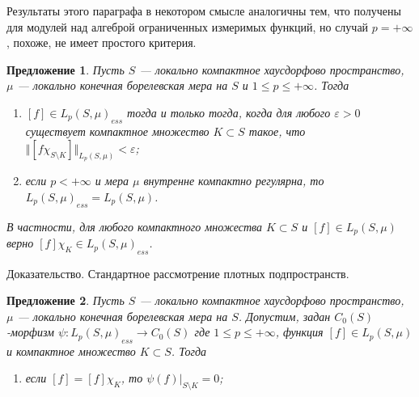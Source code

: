 \documentclass[12pt]{article}
\numberwithin{equation}{subsection}
\theoremstyle{plain}
\newtheorem{proposition}{Предложение}
\newenvironment{proof}{Доказательство.}{}
\begin{document}
\begin{fulltext}
    Результаты этого параграфа в некотором смысле аналогичны тем, что получены
    для модулей над алгеброй ограниченных измеримых функций, но случай
    $p=+\infty$, похоже, не имеет простого критерия.

    \begin{proposition}\label{LpEssC0ModCharac} Пусть $S$ --- локально
        компактное хаусдорфово пространст\-во, $\mu$ --- локально конечная
        борелевская мера на $S$ и $1\leq p\leq+\infty$. Тогда

        \begin{enumerate}[label = (\roman*)]
            \item $[f]\in {L_p(S,\mu)}_{ess}$ тогда и только тогда, когда для
                  любого $\varepsilon >0$ существует компактное множество
                  $K\subset S$ такое, что $\Vert [f\chi_{S\setminus
                              K}]\Vert_{L_p(S,\mu)}< \varepsilon$;

            \item если $p<+\infty$ и мера $\mu$ внутренне компактно регулярна,
                  то ${L_p(S,\mu)}_{ess}=L_p(S,\mu)$.
        \end{enumerate}

        В частности, для любого компактного множества $K\subset S$ и $[f]\in
            L_p(S,\mu)$ верно $[f]\chi_K\in {L_p(S,\mu)}_{ess}$.
    \end{proposition}
    \begin{proof} Стандартное рассмотрение плотных подпространств.
    \end{proof}

    \begin{proposition}\label{MorphLpEssC0Prop} Пусть $S$ --- локально
        компактное хаусдорфово пространст\-во, $\mu$ --- локально конечная
        борелевская мера на $S$. Допустим, задан $C_0(S)$-морфизм
        $\psi:{L_p(S,\mu)}_{ess}\to C_0(S)$ где $1\leq p\leq+\infty$, функция
        $[f]\in L_p(S,\mu)$ и компактное множество $K\subset S$. Тогда

        \begin{enumerate}[label = (\roman*)]
            \item если $[f]=[f]\chi_K$, то $\psi(f)|_{S\setminus K}=0$;


\end{enumerate}
\end{proposition}
\end{fulltext}
\end{document}
